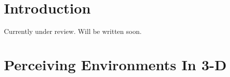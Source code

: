 \documentclass[12pt,a4paper,oneside,pdftex]{report}
\begin{document}


\chapter{Introduction}
\label{chapter:introduction}

Currently under review. Will be written soon.

\chapter{Perceiving Environments In 3-D}
\label{chapter:perceiving_environments_in_3d}
\end{document}

